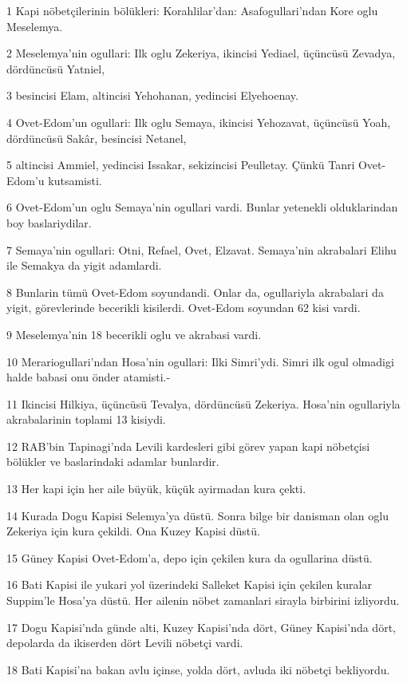 \par 1 Kapi nöbetçilerinin bölükleri: Korahlilar'dan: Asafogullari'ndan Kore oglu Meselemya.
\par 2 Meselemya'nin ogullari: Ilk oglu Zekeriya, ikincisi Yediael, üçüncüsü Zevadya, dördüncüsü Yatniel,
\par 3 besincisi Elam, altincisi Yehohanan, yedincisi Elyehoenay.
\par 4 Ovet-Edom'un ogullari: Ilk oglu Semaya, ikincisi Yehozavat, üçüncüsü Yoah, dördüncüsü Sakâr, besincisi Netanel,
\par 5 altincisi Ammiel, yedincisi Issakar, sekizincisi Peulletay. Çünkü Tanri Ovet-Edom'u kutsamisti.
\par 6 Ovet-Edom'un oglu Semaya'nin ogullari vardi. Bunlar yetenekli olduklarindan boy baslariydilar.
\par 7 Semaya'nin ogullari: Otni, Refael, Ovet, Elzavat. Semaya'nin akrabalari Elihu ile Semakya da yigit adamlardi.
\par 8 Bunlarin tümü Ovet-Edom soyundandi. Onlar da, ogullariyla akrabalari da yigit, görevlerinde becerikli kisilerdi. Ovet-Edom soyundan 62 kisi vardi.
\par 9 Meselemya'nin 18 becerikli oglu ve akrabasi vardi.
\par 10 Merariogullari'ndan Hosa'nin ogullari: Ilki Simri'ydi. Simri ilk ogul olmadigi halde babasi onu önder atamisti.-
\par 11 Ikincisi Hilkiya, üçüncüsü Tevalya, dördüncüsü Zekeriya. Hosa'nin ogullariyla akrabalarinin toplami 13 kisiydi.
\par 12 RAB'bin Tapinagi'nda Levili kardesleri gibi görev yapan kapi nöbetçisi bölükler ve baslarindaki adamlar bunlardir.
\par 13 Her kapi için her aile büyük, küçük ayirmadan kura çekti.
\par 14 Kurada Dogu Kapisi Selemya'ya düstü. Sonra bilge bir danisman olan oglu Zekeriya için kura çekildi. Ona Kuzey Kapisi düstü.
\par 15 Güney Kapisi Ovet-Edom'a, depo için çekilen kura da ogullarina düstü.
\par 16 Bati Kapisi ile yukari yol üzerindeki Salleket Kapisi için çekilen kuralar Suppim'le Hosa'ya düstü. Her ailenin nöbet zamanlari sirayla birbirini izliyordu.
\par 17 Dogu Kapisi'nda günde alti, Kuzey Kapisi'nda dört, Güney Kapisi'nda dört, depolarda da ikiserden dört Levili nöbetçi vardi.
\par 18 Bati Kapisi'na bakan avlu içinse, yolda dört, avluda iki nöbetçi bekliyordu.
